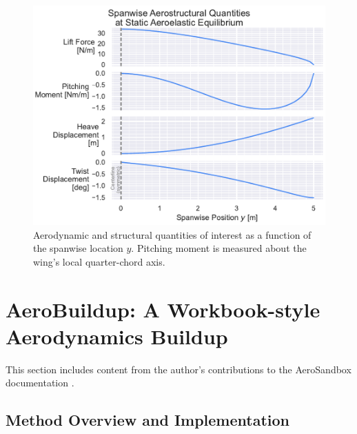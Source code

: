 \begin{figure}[H]
    \centering
    \includegraphics[width=\textwidth]{../figures/aerostructural/spanplot.pdf}
    \caption{Aerodynamic and structural quantities of interest as a function of the spanwise location $y$. Pitching moment is measured about the wing's local quarter-chord axis.}
    \label{fig:as_spanplot}
\end{figure}



\section{AeroBuildup: A Workbook-style Aerodynamics Buildup}
\label{sec:aerobuildup}

\begin{attrib}
    This section includes content from the author's contributions to the AeroSandbox documentation \cite{asb_github}.
\end{attrib}

\subsection{Method Overview and Implementation}

